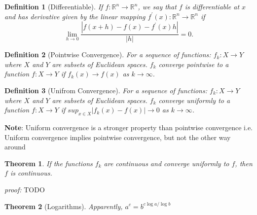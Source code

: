 \documentclass[12pt, a4paper]{article}
\newtheorem{definition}{Definition}[subsection]
\newtheorem{theorem}{Theorem}[subsection]
\begin{document}
\begin{definition}[Differentiable]
    If $f: \mathbb{R}^{n} \rightarrow \mathbb{R}^{n}$, we say that $f$ is 
    differentiable at $x$ and has derivative given by the linear mapping 
    $f^{\prime}(x): \mathbb{R}^{n} \rightarrow \mathbb{R}^{n}$ if
$$
\lim _{h \rightarrow 0} \frac{\left|f(x+h)-f(x)-f^{\prime}(x) h\right|}{|h|}=0 .
$$
\end{definition}

\begin{definition}[Pointwise Convergence]
    For a sequence of functions: $f_k : X\rightarrow Y$ where $X$ and $Y$ are subsets 
    of Euclidean spaces. $f_k$ converge pointwise to a function $f:X\rightarrow Y$ if 
    $f_k(x)\rightarrow f(x)$ as $k\rightarrow \infty$.
\end{definition}

\begin{definition}[Unifrom Convergence]
    For a sequence of functions: $f_k : X\rightarrow Y$ where $X$ and $Y$ are subsets 
    of Euclidean spaces. $f_k$ converge uniformly to a function $f:X\rightarrow Y$ if 
    $sup_{x\in X} |f_k(x)- f(x)| \rightarrow 0$ as $k\rightarrow \infty$.
\end{definition}

\textbf{Note}: Uniform convergence is a stronger property than pointwise convergence i.e. Uniform convergence implies pointwise convergence, but not the other way around

\begin{theorem}
    If the functions $f_k$ are continuous and converge uniformly to $f$, then $f$ is continuous. 
\end{theorem}

\textit{proof:} TODO


\begin{theorem}[Logarithms]
    Apparently, $a^c = b^{c\log a / \log b}$
\end{theorem}
\end{document}
